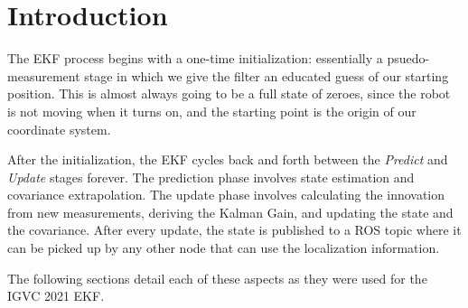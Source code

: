 \section{Introduction}

The EKF process begins with a one-time initialization: essentially a psuedo-measurement stage in which we give the filter an educated guess of our starting position. This is almost always going to be a full state of zeroes, since the robot is not moving when it turns on, and the starting point is the origin of our coordinate system.

After the initialization, the EKF cycles back and forth between the \textit{Predict} and \textit{Update} stages forever. The prediction phase involves state estimation and covariance extrapolation. The update phase involves calculating the innovation from new measurements, deriving the Kalman Gain, and updating the state and the covariance. After every update, the state is published to a ROS topic where it can be picked up by any other node that can use the localization information.

The following sections detail each of these aspects as they were used for the IGVC 2021 EKF.

